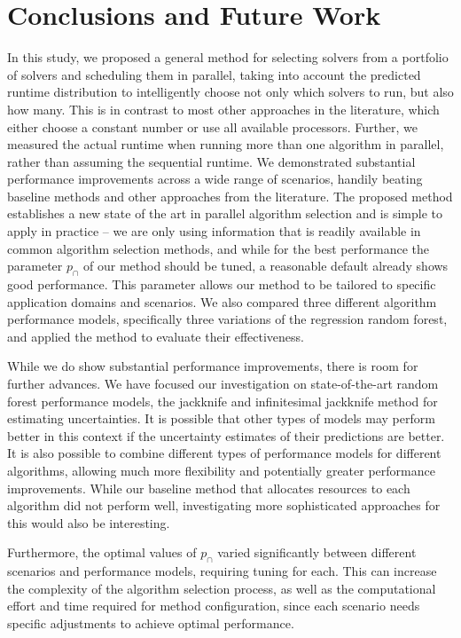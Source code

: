 \section{Conclusions and Future Work}

In this study, we proposed a general method for selecting solvers from a portfolio of solvers and scheduling them in parallel, taking into account the predicted runtime distribution to intelligently choose not only which solvers to run, but also how many. This is in contrast to most other approaches in the literature, which either choose a constant number or use all available processors. Further, we measured the actual runtime when running more than one algorithm in parallel, rather than assuming the sequential runtime. We demonstrated substantial performance improvements across a wide range of scenarios, handily beating baseline methods and other approaches from the literature. The proposed method establishes a new state of the art in parallel algorithm selection and is simple to apply in practice -- we are only using information that is readily available in common algorithm selection methods, and while for the best performance the parameter $p_{\cap}$ of our method should be tuned, a reasonable default already shows good performance. This parameter allows our method to be tailored to specific application domains and scenarios. We also compared three different algorithm performance models, specifically three variations of the regression random forest, and applied the method to evaluate their effectiveness. 

While we do show substantial performance improvements, there is room for further advances. We have focused our investigation on state-of-the-art random forest performance models, the jackknife and infinitesimal jackknife method for estimating uncertainties. It is possible that other types of models may perform better in this context if the uncertainty estimates of their predictions are better. It is also possible to combine different types of performance models for different algorithms, allowing much more flexibility and potentially greater performance improvements. While our baseline method that allocates resources to each algorithm did not perform well, investigating more sophisticated approaches for this would also be interesting. 

Furthermore, the optimal values of $p_{\cap}$ varied significantly between different scenarios and performance models, requiring tuning for each. This can increase the complexity of the algorithm selection process, as well as the computational effort and time required for method configuration, since each scenario needs specific adjustments to achieve optimal performance. 

